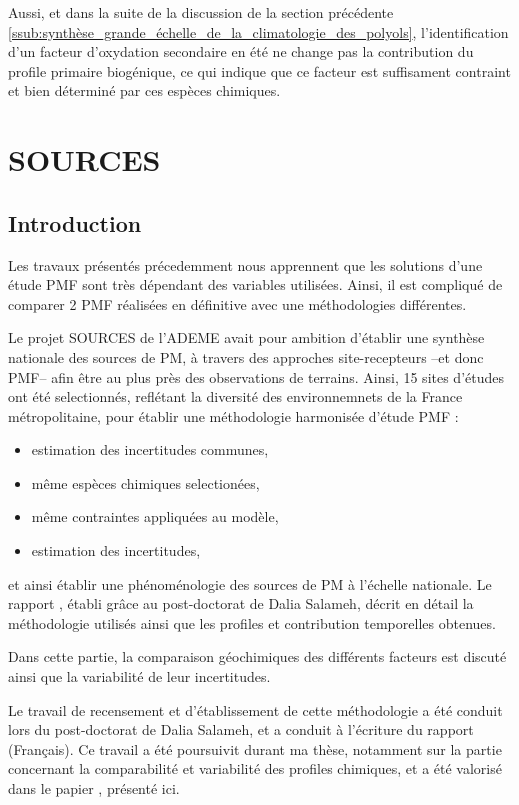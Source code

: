 Aussi, et dans la suite de la discussion de la section précédente
\ref{ssub:synthèse_grande_échelle_de_la_climatologie_des_polyols}, l'identification d'un
facteur d'oxydation secondaire en été ne change pas la contribution du profile primaire
biogénique, ce qui indique que ce facteur est suffisament contraint et bien déterminé par
ces espèces chimiques.

\clearpage

\section{SOURCES}%
\label{sec:sources}

\subsection{Introduction}

Les travaux présentés précedemment nous apprennent que les solutions d'une étude PMF sont
très dépendant des variables utilisées. Ainsi, il est compliqué de comparer 2 PMF
réalisées en définitive avec une méthodologies différentes.

Le projet SOURCES de l'ADEME avait pour ambition d'établir une synthèse nationale des
sources de PM, à travers des approches site-recepteurs --et donc PMF-- afin être au plus
près des observations de terrains.
Ainsi, 15 sites d'études ont été selectionnés, reflétant la diversité des environnemnets
de la France métropolitaine, pour établir une méthodologie harmonisée d'étude PMF :
\begin{itemize}
    \item estimation des incertitudes communes,
    \item même espèces chimiques selectionées,
    \item même contraintes appliquées au modèle,
    \item estimation des incertitudes,
\end{itemize}
et ainsi établir une phénoménologie des sources de PM à l'échelle nationale.
Le rapport \cite{favezTraitement2017}, établi grâce au post-doctorat de Dalia Salameh,
décrit en détail la méthodologie utilisés ainsi que les profiles et contribution
temporelles obtenues.

Dans cette partie, la comparaison géochimiques des différents facteurs est discuté ainsi
que la variabilité de leur incertitudes.

\begin{tcolorbox}[colback=red!5!white,colframe=Melon,title=Note]
    Le travail de recensement et d'établissement de cette méthodologie a été conduit lors
    du post-doctorat de Dalia Salameh, et a conduit à l'écriture du rapport 
    \cite{favezTraitement2017} (Français). Ce travail a été poursuivit durant ma thèse,
    notamment sur la partie concernant la comparabilité et variabilité des profiles
    chimiques, et a été valorisé dans le papier \cite{weberComparison2019}, présenté ici.
\end{tcolorbox}

